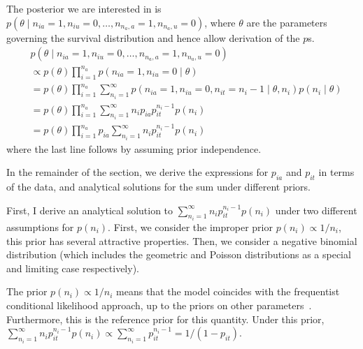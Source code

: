 \documentclass[main.tex]{subfiles}
\begin{document}
The posterior we are interested in is
$p(\theta \mid n_{ia} = 1, n_{iu} = 0, \dots, n_{n_a,a} = 1, n_{n_a,u} = 0)$,
where $\theta$ are the parameters governing the survival distribution
and hence allow derivation of the $p$s.
\begin{align}
&p(\theta \mid n_{ia} = 1, n_{iu} = 0, \dots, n_{n_a,a} = 1, n_{n_a,u} = 0) \\
&\propto p(\theta) \prod_{i=1}^{n_a} p(n_{ia} = 1, n_{iu} = 0 \mid \theta) \\
&= p(\theta) \prod_{i=1}^{n_a} \sum_{n_i=1}^\infty p(n_{ia} = 1, n_{iu} = 0, n_{it} = n_i - 1 \mid \theta, n_i) p(n_i \mid \theta) \\
&= p(\theta) \prod_{i=1}^{n_a} \sum_{n_i=1}^\infty n_i p_{ia} p_{it}^{n_i- 1} p(n_i) \\
&= p(\theta) \prod_{i=1}^{n_a} p_{ia} \sum_{n_i=1}^\infty n_i p_{it}^{n_i- 1} p(n_i)
\end{align}
where the last line follows by assuming prior independence.

In the remainder of the section, we derive the expressions for $p_{ia}$ and
$p_{it}$ in terms of the data, and analytical solutions for the sum
under different priors.

First, I derive an analytical solution to $\sum_{n_i=1}^\infty n_i p_{it}^{n_i- 1} p(n_i)$ under two different assumptions for $p(n_i)$.
First, we consider the improper prior $p(n_i) \propto 1/n_i$, this prior has several attractive properties.
Then, we consider a negative binomial distribution (which includes the geometric and Poisson distributions as a special and limiting case respectively).

The prior $p(n_i) \propto 1/n_i$ means that the model coincides with the frequentist conditional likelihood approach, up to the priors on other parameters~\cites[section 4.2]{dempsterMaximum}{heiseyModelling}[section 8.7.5]{gelmanBayesian}.
Furthermore, this is the reference prior for this quantity\autocite{heBayesiana}.
Under this prior,
$\sum_{n_i=1}^\infty n_i p_{it}^{n_i- 1} p(n_i) \propto \sum_{n_i=1}^\infty p_{it}^{n_i-1} = 1/(1-p_{it})$.
\end{document}

